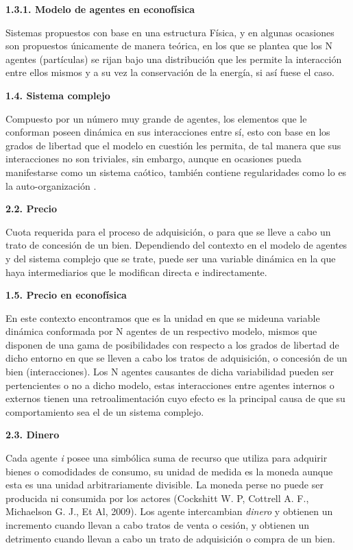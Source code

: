{
\Large  \textbf{1.3.1. Modelo de agentes en econofísica} 
}

Sistemas propuestos con base en una estructura Física, y en algunas ocasiones son propuestos únicamente de manera teórica, en los que se plantea que los N agentes (partículas) se rijan bajo una distribución que les permite la interacción entre ellos mismos y a su vez la conservación de la energía, si así fuese el caso.
\newline

{
\Large  \textbf{1.4. Sistema complejo} 
}

Compuesto por un número muy grande de agentes, los elementos que le conforman poseen dinámica en sus interacciones entre sí, esto con base en los grados de libertad que el modelo en cuestión les permita, de tal manera que sus interacciones no son triviales, sin embargo, aunque en ocasiones pueda manifestarse como un sistema caótico, también contiene regularidades como lo es la auto-organización .
\newline

{
\Large  \textbf{2.2. Precio} 
}

Cuota requerida para el proceso de adquisición, o para que se lleve a cabo un trato de concesión de un bien. Dependiendo del contexto en el modelo de agentes y del sistema complejo que se trate, puede ser una variable dinámica en la que haya intermediarios que le modifican directa e indirectamente.
\newline

{
\Large  \textbf{1.5. Precio en econofísica} 
}

En este contexto encontramos que es la unidad en que se \guillemotleft  mide\guillemotright una variable dinámica conformada por N agentes de un respectivo modelo, mismos que disponen de una gama de posibilidades con respecto a los grados de libertad de dicho entorno en que se lleven a cabo los tratos de adquisición, o concesión de un bien (interacciones). Los N agentes causantes de dicha variabilidad pueden ser pertencientes o no a dicho modelo, estas interacciones entre agentes internos o externos tienen una retroalimentación cuyo efecto es la principal causa de que su comportamiento sea el de un sistema complejo.

\newpage

{
\Large  \textbf{2.3.  Dinero} 
}

Cada agente \textit{i} posee una simbólica suma de recurso que utiliza para adquirir bienes o comodidades de consumo, su unidad de medida es la \guillemotleft moneda \guillemotright aunque esta es una unidad arbitrariamente divisible. La moneda perse no puede ser producida ni consumida por los actores   (Cockshitt W. P, Cottrell A. F., Michaelson G. J., Et  Al, 2009). Los agente intercambian \textit{dinero}  y obtienen un incremento cuando llevan a cabo tratos de venta o cesión, y obtienen un detrimento cuando llevan a cabo un trato de adquisición o compra de un bien. 
\newline


